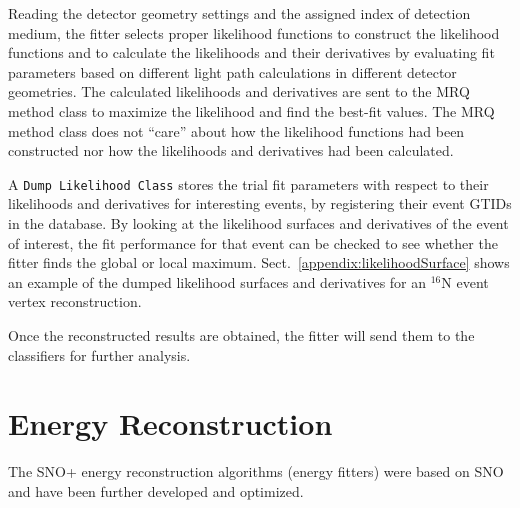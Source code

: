 Reading the detector geometry settings and the assigned index of detection medium, the fitter selects proper likelihood functions to construct the likelihood functions and to calculate the likelihoods and their derivatives by evaluating fit parameters based on different light path calculations in different detector geometries. The calculated likelihoods and derivatives are sent to the MRQ method class to maximize the likelihood and find the best-fit values. The MRQ method class does not ``care'' about how the likelihood functions had been constructed nor how the likelihoods and derivatives had been calculated. 
	
A \texttt{Dump Likelihood Class} stores the trial fit parameters with respect to their likelihoods and derivatives for interesting events, by registering their event GTIDs in the database. By looking at the likelihood surfaces and derivatives of the event of interest, the fit performance for that event can be checked to see whether the fitter finds the global or local maximum. Sect.~\ref{appendix:likelihoodSurface} shows an example of the dumped likelihood surfaces and derivatives for an $^{16}$N event vertex reconstruction. 

Once the reconstructed results are obtained, the fitter will send them to the classifiers for further analysis. 

\section{Energy Reconstruction}\label{sect:energyFitter}

The SNO+ energy reconstruction algorithms (energy fitters) were based on SNO\cite{boulay2004direct,moffat2001optical} and have been further developed and optimized\cite{jones2011background,walker2016study,energyRSP}. 

